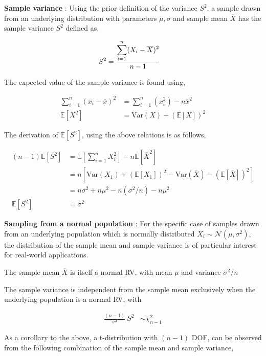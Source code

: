 \textbf{Sample variance} : Using the prior definition of the variance $ S^2 $, a sample drawn from an underlying distribution with parameters $ \mu, \sigma $ and sample mean $ \overline{X} $ has the sample variance $ S^2 $ defined as,

\begin{align}
	S^2 &= \frac{\displaystyle \sum\limits_{i=1}^{n}(X_i - \overline{X})^2}{\displaystyle n-1}
\end{align}

The expected value of the sample variance is found using,

\begin{align}
	\sum\limits_{i=1}^{n}(x_i - \overline{x})^2 &= \sum\limits_{i=1}^{n}(x_i^2) - n\overline{x}^2 \nonumber \\
	\mathbb{E}[X^2] &= \mathrm{Var}(X) + (\mathbb{E}[X])^2 \nonumber 
\end{align}

The derivation of $ \mathbb{E}[S^2] $, using the above relations is as follows,

\begin{align}
	(n-1)\mathbb{E}[S^2] &= \mathbb{E}\left[\sum\limits_{i=1}^{n}X_i^2\right] - n\mathbb{E}[\overline{X}^2] \nonumber \\
	&= n\left[\mathrm{Var}(X_1) + (\mathbb{E}[X_1])^2 - \mathrm{Var}(\overline{X}) - (\mathbb{E}[\overline{X}])^2\right] \nonumber \\
	&= n\sigma^2 + n\mu^2 - n(\sigma^2/n) - n\mu^2 \nonumber \\
	\mathbb{E}[S^2] &= \sigma^2
\end{align}

\textbf{Sampling from a normal population} : For the specific case of samples drawn from an underlying population which is normally distributed $ X_i \sim \mathcal{N}(\mu, \sigma^2) $, the distribution of the sample mean and sample variance is of particular interest for real-world applications.

The sample mean $ \overline{X} $ is itself a normal RV, with mean $ \mu $ and variance $ \sigma^2 / n $ 

The sample variance is independent from the sample mean exclusively when the underlying population is a normal RV, with

\begin{align}
	\frac{(n-1)}{\sigma^2}\ S^2 &\sim \chi^2_{n-1}
\end{align}

As a corollary to the above, a t-distribution with $ (n-1) $ DOF, can be observed from the following combination of the sample mean and sample variance,

